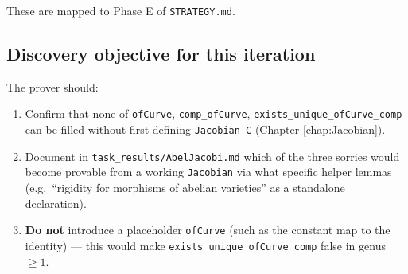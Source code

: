 These are mapped to Phase E of \texttt{STRATEGY.md}.

\subsection{Discovery objective for this iteration}

The prover should:
\begin{enumerate}
  \item Confirm that none of \lstinline{ofCurve}, \lstinline{comp_ofCurve}, \lstinline{exists_unique_ofCurve_comp} can be filled without first defining \lstinline{Jacobian C} (Chapter \ref{chap:Jacobian}).
  \item Document in \lstinline{task_results/AbelJacobi.md} which of the three sorries would become provable from a working \lstinline{Jacobian} via what specific helper lemmas (e.g.\ \enquote{rigidity for morphisms of abelian varieties} as a standalone declaration).
  \item \textbf{Do not} introduce a placeholder \lstinline{ofCurve} (such as the constant map to the identity) — this would make \lstinline{exists_unique_ofCurve_comp} false in genus $\ge 1$.
\end{enumerate}

